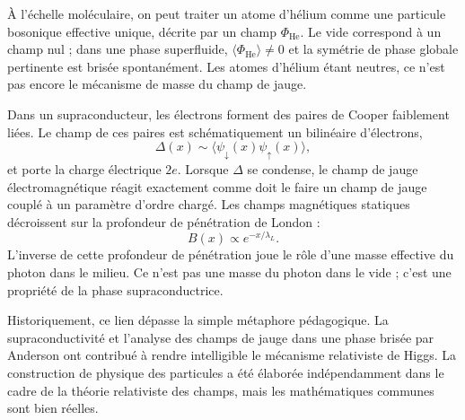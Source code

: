 À l’échelle moléculaire, on peut traiter un atome d’hélium comme une particule bosonique effective unique, décrite par un champ \(\Phi_{\mathrm{He}}\). Le vide correspond à un champ nul ; dans une phase superfluide, \(\langle\Phi_{\mathrm{He}}\rangle\ne0\) et la symétrie de phase globale pertinente est brisée spontanément. Les atomes d’hélium étant neutres, ce n’est pas encore le mécanisme de masse du champ de jauge.

Dans un supraconducteur, les électrons forment des paires de Cooper faiblement liées. Le champ de ces paires est schématiquement un bilinéaire d’électrons, \begin{equation}
  \Delta(x)\sim\langle\psi_\downarrow(x)\psi_\uparrow(x)\rangle,
  \label{eq:l10-cooper-order-parameter}
\end{equation}et porte la charge électrique \(2e\). Lorsque \(\Delta\) se condense, le champ de jauge électromagnétique réagit exactement comme doit le faire un champ de jauge couplé à un paramètre d’ordre chargé. Les champs magnétiques statiques décroissent sur la profondeur de pénétration de London : \begin{equation}
  B(x)\propto e^{-x/\lambda_L}.
  \label{eq:l10-meissner-screening}
\end{equation}L’inverse de cette profondeur de pénétration joue le rôle d’une masse effective du photon dans le milieu. Ce n’est pas une masse du photon dans le vide ; c’est une propriété de la phase supraconductrice.

\begin{classroomqa}\end{classroomqa}

Historiquement, ce lien dépasse la simple métaphore pédagogique. La supraconductivité et l’analyse des champs de jauge dans une phase brisée par Anderson ont contribué à rendre intelligible le mécanisme relativiste de Higgs. La construction de physique des particules a été élaborée indépendamment dans le cadre de la théorie relativiste des champs, mais les mathématiques communes sont bien réelles.

